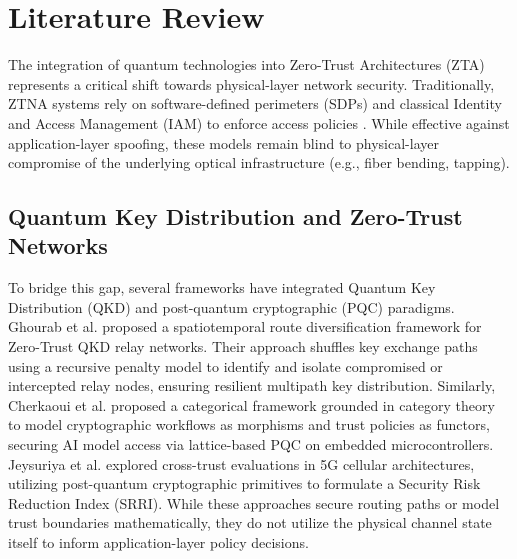 \documentclass[conference]{IEEEtran}
\begin{document}
\section{Literature Review}
The integration of quantum technologies into Zero-Trust Architectures (ZTA) represents a critical shift towards physical-layer network security. Traditionally, ZTNA systems rely on software-defined perimeters (SDPs) and classical Identity and Access Management (IAM) to enforce access policies \cite{b3}. While effective against application-layer spoofing, these models remain blind to physical-layer compromise of the underlying optical infrastructure (e.g., fiber bending, tapping).

\subsection{Quantum Key Distribution and Zero-Trust Networks}
To bridge this gap, several frameworks have integrated Quantum Key Distribution (QKD) and post-quantum cryptographic (PQC) paradigms. Ghourab et al. \cite{ghourab2025} proposed a spatiotemporal route diversification framework for Zero-Trust QKD relay networks. Their approach shuffles key exchange paths using a recursive penalty model to identify and isolate compromised or intercepted relay nodes, ensuring resilient multipath key distribution. Similarly, Cherkaoui et al. \cite{cherkaoui2026} proposed a categorical framework grounded in category theory to model cryptographic workflows as morphisms and trust policies as functors, securing AI model access via lattice-based PQC on embedded microcontrollers. Jeysuriya et al. \cite{jeysuriya2026} explored cross-trust evaluations in 5G cellular architectures, utilizing post-quantum cryptographic primitives to formulate a Security Risk Reduction Index (SRRI). While these approaches secure routing paths or model trust boundaries mathematically, they do not utilize the physical channel state itself to inform application-layer policy decisions.
\end{document}
